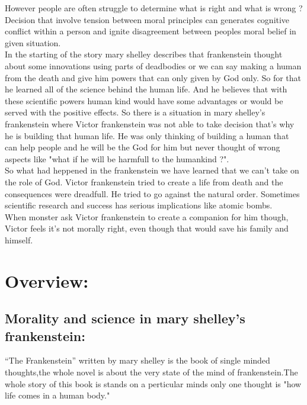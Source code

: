 \documentclass[12pt]{report}
\begin{document}
However people are often struggle to determine what is right and what is wrong ?
\\

Decision that involve tension between moral principles can generates cognitive conflict within a person and ignite disagreement between peoples moral belief in given situation.
\\
In the starting of the story mary shelley describes that frankenstein thought about some innovations using parts of deadbodies or we can say making a human from the death and give him powers that can only given by God only. So for that he learned all of the science behind the human life. And he believes that with these scientific powers human kind would have some advantages or would be served with the positive effects.
So there is a situation in mary shelley's frankenstein where Victor frankenstein was not able to take decision that's why he is building that human life. He was only thinking of building a human that can help people and he will be the God for him but never thought of wrong aspects like "what if he will be harmfull to the humankind ?". 
\\

So what had heppened in the frankenstein we have learned that we can't take on the role of God. Victor frankenstein tried to create a life from death and the consequences were dreadfull.  He tried to go against the natural order. Sometimes scientific research and success has serious implications like atomic bombs.\\

When monster ask Victor frankenstein to create a companion for him though, Victor feels it's not morally right, even though that would save his family and himself.

\section{Overview:}

\subsection{Morality and science in mary shelley's frankenstein:}
                                                             “The Frankenstein” written by mary shelley is the book of single minded thoughts,the whole novel is about the very state of the mind of frankenstein.The whole story of  this book is stands on a perticular minds only one thought is "how life comes in a human body."
\\
\end{document}

